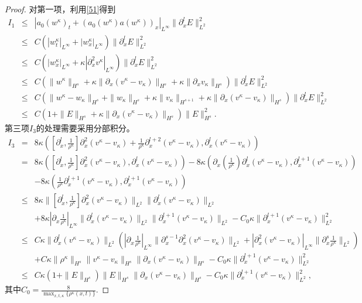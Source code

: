 \begin{proof}
对第一项，利用\eqref{51}得到
\begin{eqnarray*}
  I_1 &\le&  |a_0(w^\kappa)_t + (a_0(w^\kappa) a(w^\kappa))_x|_{L^\infty} \|\partial^l_x E\|_{L^2}^2 \nonumber\\
      &\le& C (|w^\kappa_t|_{L^\infty} + |w^\kappa_x|_{L^\infty}) \|\partial^l_x E\|_{L^2}^2 \nonumber\\
      &\le& C (|w^\kappa_x|_{L^\infty} + \kappa |\partial^2_x v^\kappa|_{L^\infty}) \|\partial^l_x E\|_{L^2}^2 \nonumber\\
      &\le& C (\|w^\kappa\|_{H^s} + \kappa \|\partial_x(v^\kappa-v_\kappa)\|_{H^s} + \kappa \|\partial_x v_\kappa\|_{H^s} )\|\partial^l_x E\|_{L^2}^2 \nonumber\\
      &\le& C (\|w^\kappa-w_\kappa\|_{H^s}+\|w_\kappa\|_{H^s}+\kappa\|v_\kappa\|_{H^{s+1}} + \kappa \|\partial_x(v^\kappa-v_\kappa)\|_{H^s}) \|\partial^l_x E\|_{L^2}^2 \nonumber\\
      &\le& C (1+\|E\|_{H^s} + \kappa \|\partial_x (v^\kappa-v_\kappa)\|_{H^s}) \|E\|_{H^s}^2. \label{516}
\end{eqnarray*}
第三项$I_3$的处理需要采用分部积分。
\begin{eqnarray*}
  I_3 &=& 8 \kappa ([\partial^l_x,\frac{1}{\rho^\kappa}] \partial^2_x(v^\kappa-v_\kappa) + \frac{1}{\rho^\kappa} \partial^{l+2}_x(v^\kappa-v_\kappa),\partial^l_x (v^\kappa-v_\kappa) )\\
  &=& 8 \kappa ([\partial^l_x,\frac{1}{\rho^\kappa}] \partial^2_x(v^\kappa-v_\kappa),\partial^l_x (v^\kappa-v_\kappa))  -8 \kappa(\partial_x (\frac{1}{\rho^\kappa}) \partial^l_x(v^\kappa-v_\kappa),\partial^{l+1}_x (v^\kappa-v_\kappa)) \\ && -8\kappa ( \frac{1}{\rho^\kappa} \partial^{l+1}_x(v^\kappa-v_\kappa), \partial^{l+1}_x (v^\kappa-v_\kappa)) \\
  &\le& 8\kappa \|[\partial^l_x,\frac{1}{\rho^\kappa}]\partial^2_x(v^\kappa-v_\kappa)\|_{L^2} \|\partial^l_x (v^\kappa-v_\kappa)\|_{L^2} \\ & &+8\kappa |\partial_x \frac{1}{\rho^\kappa}|_{L^\infty} \|\partial^l_x (v^\kappa-v_\kappa)\|_{L^2} \|\partial^{l+1}_x(v^\kappa-v_\kappa)\|_{L^2}  -C_0 \kappa \|\partial^{l+1}_x (v^\kappa-v_\kappa)\|_{L^2}^2\\
  &\le& C\kappa \|\partial^l_x (v^\kappa-v_\kappa)\|_{L^2} (|\partial_x \frac{1}{\rho^\kappa}|_{L^\infty} \|\partial_x^{s-1} \partial^2_x(v^\kappa-v_\kappa)\|_{L^2} + |\partial^2_x (v^\kappa-v_\kappa)|_{L^\infty} \|\partial^s_x \frac{1}{\rho^\kappa}\|_{L^2})  \\ & & + C\kappa \|\rho^\kappa\|_{H^s} \|v^\kappa-v_\kappa\|_{H^s}\|\partial_x (v^\kappa-v_\kappa)\|_{H^s} -C_0 \kappa\|\partial^{l+1}_x (v^\kappa-v_\kappa)\|_{L^2}^2\\
  &\le& C\kappa (1+ \|E\|_{H^s})\|E\|_{H^s} \|\partial_x (v^\kappa-v_\kappa)\|_{H^s}-C_0 \kappa \|\partial^{l+1}_x (v^\kappa-v_\kappa)\|_{L^2}^2 ,
\end{eqnarray*}
其中$C_0 =\frac{ 8}{{\max_{x,t,\kappa} \{\rho^\kappa(x,t) \}}}$.


\end{proof}
